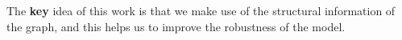 The \textbf{key} idea of this work is that we make use of the structural information of the graph, and this helps us to improve the robustness of the model.
